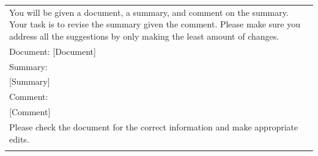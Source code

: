 \documentclass[11pt]{article}
\begin{document}
\begin{table}[htbp]
{\begin{tabular}{p{13cm}}
You will be given a document, a summary, and comment on the summary. Your task is to revise the summary given the comment. Please make sure you address all the suggestions by only making the least amount of changes. \\
Document:
{[}Document{]} \\
Summary: \\
{[}Summary{]} \\
Comment: \\
{[}Comment{]} \\
Please check the document for the correct information and make appropriate edits. \\
\Xhline{1pt}
\end{tabular}
}
\end{table}
\end{document}
